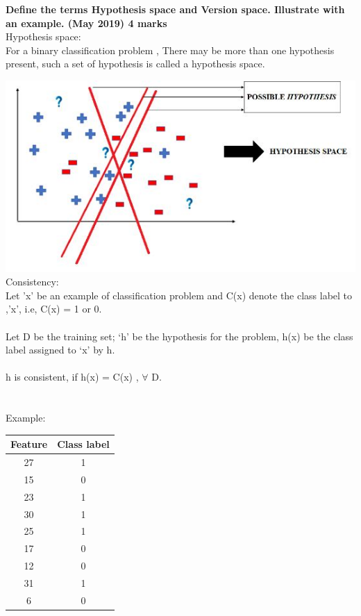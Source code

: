 
\textbf{\textcolor{LightMagenta}{Define the terms Hypothesis space and Version space. Illustrate with an 
example. (May 2019) \hfill 4 marks}}
\\[5pt]
Hypothesis space:\\
For a binary classification problem , There may be more than one hypothesis present, such a set of hypothesis is called a hypothesis space.\\


\graphicspath{ {./} }
\includegraphics{Images/A23_img1.JPG}\\
Consistency:\\
Let 'x' be an example of classification problem and C(x) denote the class label to ,'x', i.e, C(x) = 1 or 0.\\
\\
Let  D be the training set; ‘h’ be the hypothesis for the problem, h(x) be the class label assigned to ‘x’ by h.\\
\\
h is consistent, if h(x) = C(x) , $\forall$ D.\\
\\
\\
Example:
 \begin{table}[h]                           
 \centering
    \begin{tabular}{|c|c|}
    \hline
  Feature   &    Class label            \\ \hline
     27     &  1     \\ \hline          
     15    &  0 \\ \hline
     23    &   1   \\ \hline
     30   &    1    \\ \hline
      25   &    1  \\ \hline
     17   &     0   \\ \hline
    12  &     0 \\ \hline
     31   &   1     \\ \hline
 6&     0   \\ \hline

    \end{tabular}
    \label{tab:msg1}                            

\end{table}\\
